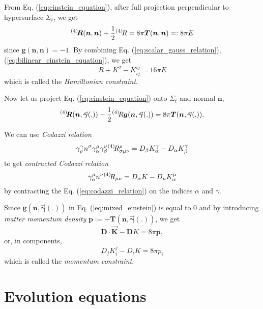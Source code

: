 From Eq. (\ref{eq:einstein_equation}), after full projection perpendicular to hypersurface $\Sigma_t$, we get
\begin{equation}
	\label{eq:bilinear_einstein_equation}
	{}^{(4)}\hspace{-0.2em} \bm{R}(\bm{n}, \bm{n}) + \frac{1}{2}{}^{(4)}\hspace{-0.2em} R = 8\pi \bm{T}(\bm{n}, \bm{n}) =: 8\pi E
\end{equation}
since $\bm{g}(\bm{n}, \bm{n}) = -1$. By combining Eq. (\ref{eq:scalar_gauss_relation}), (\ref{eq:bilinear_einstein_equation}), we get
\begin{equation}
	R+K^2 - K_{ij}^{ij} = 16\pi E
\end{equation}
which is called the \emph{Hamiltonian constraint}.

Now let us project Eq. (\ref{eq:einstein_equation}) onto $\Sigma_t$ and normal $\bm{n}$,
\begin{equation}
	\label{eq:mixed_einstein}
	{}^{(4)}\hspace{-0.2em} \bm{R}(\bm{n}, \vec{\bm{\gamma}}(.)) - \frac{1}{2} {}^{(4)}\hspace{-0.2em} R \bm{g}(\bm{n}, \vec{\bm{\gamma}}(.)) = 8\pi \bm{T}(\bm{n}, \vec{\bm{\gamma}}(.)).
\end{equation}

We can use \emph{Codazzi relation}
\begin{equation}
	\label{eq:codazzi_relation}
	\gamma^\gamma_\rho n^\sigma \gamma^\mu_\alpha\gamma^\nu_\beta {}^{(4)}\hspace{-0.2em} R^\rho_{\sigma \mu \nu} = D_\beta K^\gamma_\alpha - D_\alpha K^\gamma_\beta
\end{equation}
to get \emph{contracted Codazzi relation}
\begin{equation}
	\gamma^\mu_\alpha n^\nu {}^{(4)}\hspace{-0.2em} R_{\mu \nu} = D_\alpha K - D_\mu K^\mu _\alpha
\end{equation}
by contracting the Eq. (\ref{eq:codazzi_relation}) on the indices $\alpha$ and $\gamma$.

Since $\bm{g}(\bm{n}, \vec{\bm{\gamma}}(.))$ in Eq. (\ref{eq:mixed_einstein}) is equal to $0$ and by introducing \emph{matter momentum density} $\bm{p}:= - \bm{T}(\bm{n}, \vec{\bm{\gamma}}(.))$, we get
\begin{equation}
	\bm{D}\cdot \vec{\bm{K}} - \bm{D}K = 8 \pi \bm{p},
\end{equation}
or, in components,
\begin{equation}
	D_j K^j_i - D_i K = 8 \pi p_i
\end{equation}
which is called the \emph{momentum constraint}.



\section{Evolution equations}

